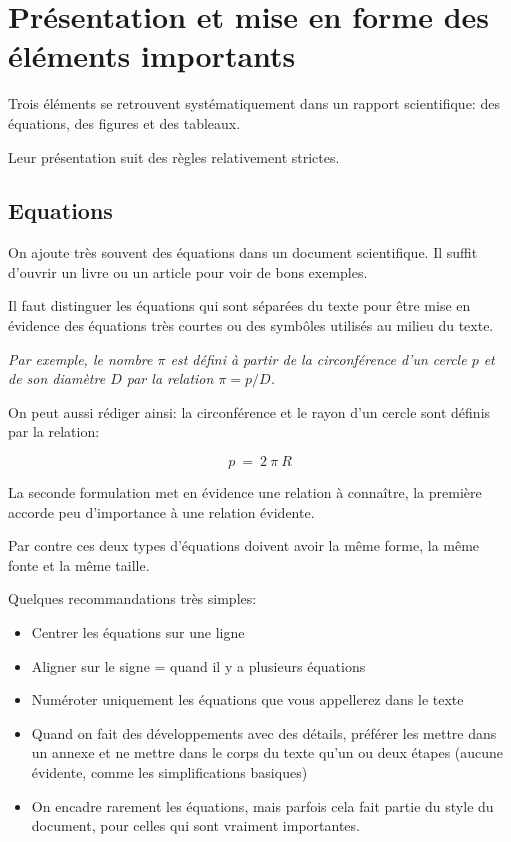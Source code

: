 \section{Présentation et mise en forme des éléments importants}  

Trois éléments se retrouvent systématiquement dans un rapport scientifique:
des équations, des figures et des tableaux.

Leur présentation suit des règles relativement strictes. 



\subsection{Equations}
 
On ajoute très souvent des équations dans un document scientifique. 
Il suffit d'ouvrir  un livre ou un article pour voir de bons exemples. 

Il faut distinguer les équations qui sont séparées du texte pour être mise en évidence des équations très courtes ou des symbôles utilisés au milieu du texte.


{\it Par exemple, le nombre $\pi$ est défini à partir de la circonférence d'un cercle $p$ et de son diamètre $D$ par la relation $\pi = p / D$.

On peut aussi rédiger ainsi: la circonférence et le rayon d'un cercle sont définis par la relation:

\begin{equation}
 p~=~2~\pi~R
\end{equation}
}
La seconde formulation met en évidence une relation à connaître, la première accorde peu d'importance à une relation évidente.


Par contre ces deux types d'équations doivent avoir la même forme, la même fonte et la même taille.

Quelques recommandations très simples:

\begin{itemize}
\item Centrer les équations sur une ligne
\item Aligner sur le signe = quand il y a plusieurs équations
\item Numéroter uniquement les équations que vous appellerez dans le texte
\item Quand on fait des développements avec des détails, préférer les mettre dans un annexe et ne mettre dans le corps du texte qu'un ou deux étapes (aucune évidente, comme les simplifications basiques)
\item On encadre rarement les équations, mais parfois cela fait partie du style du document, pour celles qui sont vraiment importantes.
\end{itemize}

